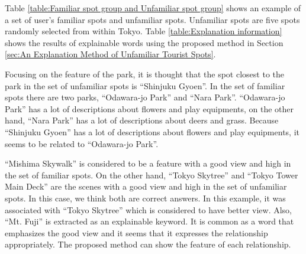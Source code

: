 \documentclass[journal]{IAENGtran}
\begin{document}
Table \ref{table:Familiar spot group and Unfamiliar spot group} shows an example of a set of user's familiar spots and unfamiliar spots.
Unfamiliar spots are five spots randomly selected from within Tokyo.
Table \ref{table:Explanation information} shows the results of explainable words using the proposed method in Section \ref{sec:An Explanation Method of Unfamiliar Tourist Spots}.

Focusing on the feature of the park, it is thought that the spot closest to the park in the set of unfamiliar spots is ``Shinjuku Gyoen''.
In the set of familiar spots there are two parks, ``Odawara-jo Park'' and ``Nara Park''.
``Odawara-jo Park'' has a lot of descriptions about flowers and play equipments, on the other hand, ``Nara Park'' has a lot of descriptions about deers and grass.
Because ``Shinjuku Gyoen'' has a lot of descriptions about flowers and play equipments, it seems to be related to ``Odawara-jo Park''.

``Mishima Skywalk'' is considered to be a feature with a good view and high in the set of familiar spots.
On the other hand, ``Tokyo Skytree'' and ``Tokyo Tower Main Deck'' are the scenes with a good view and high in the set of unfamiliar spots.
In this case, we think both are correct answers. In this example, it was associated with ``Tokyo Skytree'' which is considered to have better view.
Also, ``Mt. Fuji'' is extracted as an explainable keyword. It is common as a word that emphasizes the good view and it seems that it expresses the relationship appropriately.
The proposed method can show the feature of each relationship.
\end{document}
